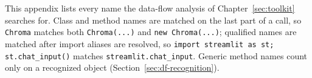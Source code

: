 \label{app:patterns}

This appendix lists every name the data-flow analysis of Chapter~\ref{sec:toolkit} searches for. Class and method names are matched on the last part of a call, so \texttt{Chroma} matches both \texttt{Chroma(...)} and \texttt{new Chroma(...)}; qualified names are matched after import aliases are resolved, so \texttt{import streamlit as st; st.chat\_input()} matches \texttt{streamlit.chat\_input}. Generic method names count only on a recognized object (Section~\ref{sec:df-recognition}).

